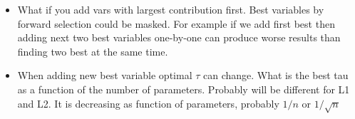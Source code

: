

\begin{itemize}
\item What if you add vars with largest contribution first. Best variables by forward selection could be masked. For example if we add first best then adding next two best variables one-by-one can produce worse results than finding two best at the same time.

\item When adding new best variable optimal $\tau$ can change. What is the best tau as a function of the number of parameters. Probably will be different for L1 and L2. It is decreasing as function of parameters, probably $1/n$ or $1/\sqrt{n}$

\end{itemize}



